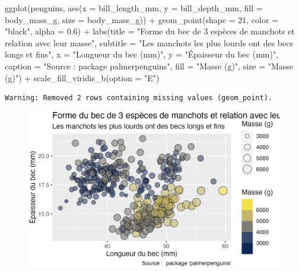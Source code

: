 \documentclass[
  letterpaper,
  DIV=11,
  numbers=noendperiod]{scrreprt}
\newenvironment{Shaded}{\begin{snugshade}}{\end{snugshade}}
\newcommand{\AttributeTok}[1]{\textcolor[rgb]{0.40,0.45,0.13}{#1}}
\newcommand{\DecValTok}[1]{\textcolor[rgb]{0.68,0.00,0.00}{#1}}
\newcommand{\FloatTok}[1]{\textcolor[rgb]{0.68,0.00,0.00}{#1}}
\newcommand{\FunctionTok}[1]{\textcolor[rgb]{0.28,0.35,0.67}{#1}}
\newcommand{\NormalTok}[1]{\textcolor[rgb]{0.00,0.23,0.31}{#1}}
\newcommand{\SpecialCharTok}[1]{\textcolor[rgb]{0.37,0.37,0.37}{#1}}
\newcommand{\StringTok}[1]{\textcolor[rgb]{0.13,0.47,0.30}{#1}}
\begin{document}
\begin{Shaded}
\begin{Highlighting}[]
\FunctionTok{ggplot}\NormalTok{(penguins, }\FunctionTok{aes}\NormalTok{(}\AttributeTok{x =}\NormalTok{ bill\_length\_mm, }\AttributeTok{y =}\NormalTok{ bill\_depth\_mm,}
                     \AttributeTok{fill =}\NormalTok{ body\_mass\_g, }\AttributeTok{size =}\NormalTok{ body\_mass\_g)) }\SpecialCharTok{+}
  \FunctionTok{geom\_point}\NormalTok{(}\AttributeTok{shape =} \DecValTok{21}\NormalTok{, }\AttributeTok{color =} \StringTok{"black"}\NormalTok{, }\AttributeTok{alpha =} \FloatTok{0.6}\NormalTok{) }\SpecialCharTok{+}
  \FunctionTok{labs}\NormalTok{(}\AttributeTok{title =} \StringTok{"Forme du bec de 3 espèces de manchots et relation avec leur masse"}\NormalTok{,}
       \AttributeTok{subtitle =} \StringTok{"Les manchots les plus lourds ont des becs longs et fins"}\NormalTok{,}
       \AttributeTok{x =} \StringTok{"Longueur du bec (mm)"}\NormalTok{,}
       \AttributeTok{y =} \StringTok{"Épaisseur du bec (mm)"}\NormalTok{,}
       \AttributeTok{caption =} \StringTok{"Source :  package \textquotesingle{}palmerpenguins\textquotesingle{}"}\NormalTok{,}
       \AttributeTok{fill =} \StringTok{"Masse (g)"}\NormalTok{,}
       \AttributeTok{size =} \StringTok{"Masse (g)"}\NormalTok{) }\SpecialCharTok{+}
  \FunctionTok{scale\_fill\_viridis\_b}\NormalTok{(}\AttributeTok{option =} \StringTok{"E"}\NormalTok{)}
\end{Highlighting}
\end{Shaded}

\begin{verbatim}
Warning: Removed 2 rows containing missing values (geom_point).
\end{verbatim}

\begin{figure}[H]

{\centering \includegraphics{./03-visualization_files/figure-pdf/unnamed-chunk-94-1.png}

}

\end{figure}
\end{document}
